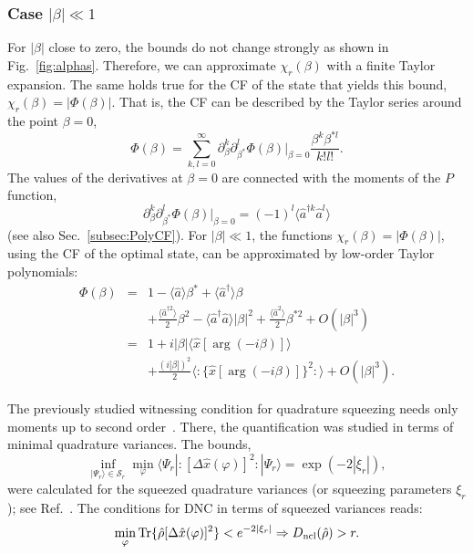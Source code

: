 \documentclass[aps,pra,twocolumn,showpacs,superscriptaddress,10pt]{revtex4-1}
\begin{document}
\subsubsection*{Case $|\beta|\ll1$}
	For $|\beta|$ close to zero, the bounds do not change strongly as shown in Fig.~\ref{fig:alphas}.
	Therefore, we can approximate $\chi_r(\beta)$ with a finite Taylor expansion.
	The same holds true for the CF of the state that yields this bound, $\chi_r(\beta)=|\Phi(\beta)|$.
	That is, the CF can be described by the Taylor series around the point $\beta{=}0$,
	\begin{equation}
		\Phi(\beta)=\sum\limits_{k,l=0}^{\infty} \partial_{\beta}^k\partial_{\beta^\ast}^l\Phi(\beta)\Big|_{\beta=0}\frac{\beta^k\beta^{\ast l}}{k!l!}.
	\end{equation}
	The values of the derivatives at $\beta{=}0$ are connected  with the moments of the $P$ function,
	\begin{equation}
		\partial_{\beta}^k\partial_{\beta^\ast}^l\Phi(\beta)\Big|_{\beta=0}=(-1)^l\langle\hat{a}^{\dag k}\hat{a}^l\rangle
	\end{equation}
	(see also Sec.~\ref{subsec:PolyCF}).
	For $|\beta|\ll1$, the functions $\chi_r(\beta)=|\Phi(\beta)|$, using the CF of the optimal state, can be approximated by low-order Taylor polynomials:
	\begin{eqnarray}
		\Phi(\beta)&=&1{-}\langle\hat{a}\rangle\beta^\ast+\langle\hat{a}^\dag\rangle\beta\nonumber\\
		&&+\frac{\langle\hat{a}^{\dag 2}\rangle}{2}\beta^2-\langle\hat{a}^\dag\hat{a}\rangle|\beta|^2+\frac{\langle\hat{a}^2\rangle}{2}\beta^{\ast 2}+O(|\beta|^3)\nonumber\\
		&=&1+i|\beta|\langle\hat{x}[\arg(-i\beta)]\rangle\nonumber\\
		&&+\frac{(i|\beta|)^2}{2}\langle{:}\{\hat{x}[\arg(-i\beta)]\}^2{:}\rangle+O(|\beta|^3).
	\end{eqnarray}
	
	The previously studied witnessing condition for quadrature squeezing needs only moments up to second order~\cite{Mraz2014}.
	There, the quantification was studied in terms of minimal quadrature variances.
	The bounds,
	\begin{equation}
		\inf\limits_{|\Psi_r\rangle\in\mathcal{S}_r}\min\limits_{\varphi}\langle\Psi_r|{:}[\Delta \hat{x}(\varphi)]^2{:}|\Psi_r\rangle=\exp(-2|\xi_r|),
	\end{equation}
	were calculated for the squeezed quadrature variances (or squeezing parameters $\xi_r$); see Ref.~\cite{Mraz2014}.
	The conditions for DNC in terms of squeezed variances reads:
	\begin{equation}
		\min\limits_{\varphi}{\rm Tr}\{\hat{\rho}[\Delta\hat{x}(\varphi)]^2\} <e^{-2|\xi_r|}\Rightarrow D_{\rm ncl}(\hat{\rho})>r.
	\end{equation}
\end{document}
